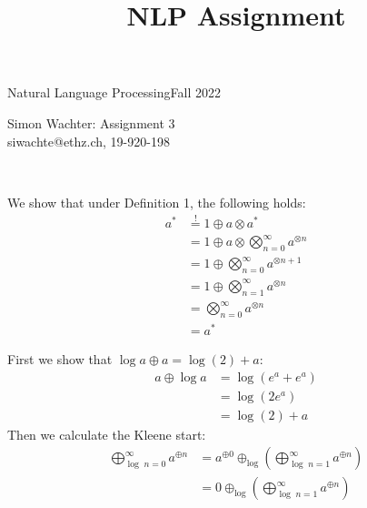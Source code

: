 \documentclass[a4paper,12pt]{ETHexercise}
\title{NLP Assignment}
\begin{document}


\newcommand{\pair}[2]{{\langle #1 , #2 \rangle}}
\newcommand{\score}[2]{\text{score}_{\theta}(\langle #1, #2 \rangle, \boldsymbol{w})}
\newcommand{\sscore}[1]{\text{score}_{\theta}(#1, \boldsymbol{w})}

{}
{\Large Natural Language Processing}{Fall 2022}
\begin{center}
	{\Huge Simon Wachter: Assignment 3}\\
	\quad\newline
	siwachte@ethz.ch, 19-920-198\\
	\quad\newline
	\timestamp
\end{center}
\begin{question}\\
	\begin{subquestion}
		We show that under Definition 1, the following holds:
		\begin{align}
			a^* & \overset{!}{=} 1 \oplus a \otimes a^*                        \\
			    & = 1 \oplus a \otimes \bigotimes_{n=0}^{\infty} a^{\otimes n} \\
			    & = 1 \oplus \bigotimes_{n=0}^{\infty} a^{\otimes n+1}         \\
			    & = 1 \oplus \bigotimes_{n=1}^{\infty} a^{\otimes n}           \\
			    & = \bigotimes_{n=0}^{\infty} a^{\otimes n}                    \\
			    & = a^*
		\end{align}
	\end{subquestion}
	\begin{subquestion}
		First we show that $\log a \oplus a = \log(2) + a$:
		\begin{align}
			a \oplus \log a & = \log(e^{a} + e^{a}) \\
			                & = \log(2 e^{a})       \\
			                & = \log(2) + a
		\end{align}
		Then we calculate the Kleene start:
		\begin{align}
			\bigoplus_{\log \; n=0}^{\infty} a^{\oplus n} & = a^{\oplus 0} \oplus_{\log} \left( \bigoplus_{\log \; n=1}^{\infty} a^{\oplus n} \right)   \\
			                                              & = 0 \oplus_{\log} \left( \bigoplus_{\log \; n=1}^{\infty} a^{\oplus n} \right)              \\

\end{align}
\end{subquestion}
\end{question}
\end{document}
